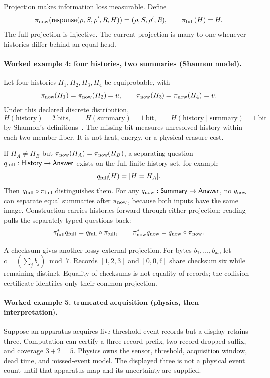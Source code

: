 Projection makes information loss measurable.  Define
\[
 \pi_{\rm now}(\operatorname{response}(\rho,S,\rho',R,H))=(\rho,S,\rho',R),
 \qquad
 \pi_{\rm full}(H)=H.
\]
The full projection is injective.  The current projection is many-to-one whenever histories differ behind an equal
head.

\paragraph{Worked example 4: four histories, two summaries (Shannon model).}
Let four histories \(H_1,H_2,H_3,H_4\) be equiprobable, with
\[
 \pi_{\rm now}(H_1)=\pi_{\rm now}(H_2)=u,\qquad
 \pi_{\rm now}(H_3)=\pi_{\rm now}(H_4)=v.
\]
Under this declared discrete distribution,
\[
 H(\text{history})=2\ \text{bits},\qquad
 H(\text{summary})=1\ \text{bit},\qquad
 H(\text{history}\mid\text{summary})=1\ \text{bit}
\]
by Shannon's definitions~\cite{shannon1948}.  The missing bit measures unresolved history within each two-member
fiber.  It is not heat, energy, or a physical erasure cost.

If \(H_A\ne H_B\) but \(\pi_{\rm now}(H_A)=\pi_{\rm now}(H_B)\), a separating question
\(q_{\rm full}:\mathsf{History}\to\mathsf{Answer}\) exists on the full finite history set, for example
\[
 q_{\rm full}(H)=[H=H_A].
\]
Then \(q_{\rm full}\circ\pi_{\rm full}\) distinguishes them.  For any
\(q_{\rm now}:\mathsf{Summary}\to\mathsf{Answer}\), no \(q_{\rm now}\) can separate equal summaries after
\(\pi_{\rm now}\), because both inputs have the same image.  Construction carries histories forward through either
projection; reading pulls the separately typed questions back:
\[
 \pi_{\rm full}^*q_{\rm full}=q_{\rm full}\circ\pi_{\rm full},
 \qquad
 \pi_{\rm now}^*q_{\rm now}=q_{\rm now}\circ\pi_{\rm now}.
\]

A checksum gives another lossy external projection.  For bytes \(b_1,\ldots,b_m\), let
\(c=(\sum_j b_j)\bmod7\).  Records \([1,2,3]\) and \([0,0,6]\) share checksum six while remaining distinct.  Equality
of checksums is not equality of records; the collision certificate identifies only their common projection.

\paragraph{Worked example 5: truncated acquisition (physics, then interpretation).}
Suppose an apparatus acquires five threshold-event records but a display retains three.  Computation can certify a
three-record prefix, two-record dropped suffix, and coverage \(3+2=5\).  Physics owns the sensor, threshold, acquisition
window, dead time, and missed-event model.  The displayed three is not a physical event count until that apparatus map
and its uncertainty are supplied.

